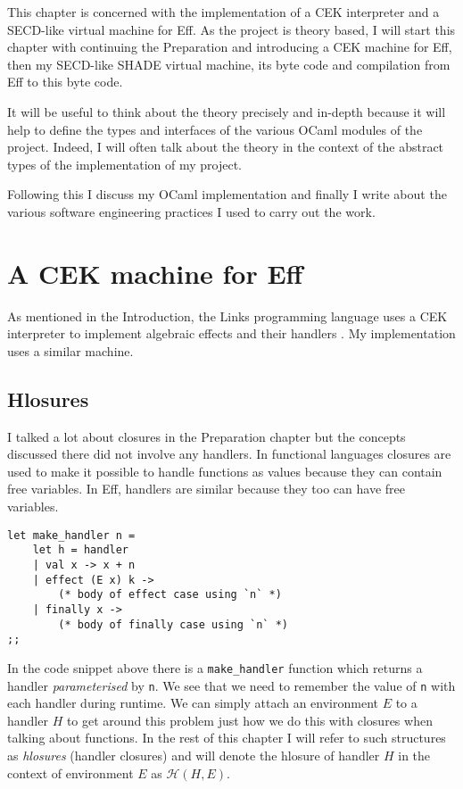 \documentclass[class=article, crop=false]{standalone}
\begin{document}
This chapter is concerned with the implementation of a CEK interpreter and
a SECD-like virtual machine for Eff. As the project is theory based, I will start this chapter
with continuing the Preparation and introducing a CEK machine for Eff, then my SECD-like
SHADE virtual machine, its byte code and compilation from Eff to this byte code.

It will be useful to think about the theory precisely and in-depth because it will
help to define the types and interfaces of the various OCaml modules of the project.
Indeed, I will often talk about the theory in the context of the abstract types
of the implementation of my project.

Following this I discuss my OCaml implementation and finally I write about the various 
software engineering practices I used to carry out the work.

\section{A CEK machine for Eff}

As mentioned in the Introduction, the Links programming language uses a CEK interpreter
to implement algebraic effects and their handlers \cite{hillerstrom2016compilation}.
My implementation uses a similar machine.

\subsection{Hlosures}

I talked a lot about closures in the Preparation chapter but the concepts discussed there
did not involve any handlers. In functional languages closures are used to make it possible
to handle functions as values because they can contain free variables. In Eff, handlers are
similar because they too can have free variables.

\begin{lstlisting}[language=efflang]
let make_handler n =
    let h = handler
    | val x -> x + n
    | effect (E x) k ->
        (* body of effect case using `n` *)
    | finally x ->
        (* body of finally case using `n` *)
;;
\end{lstlisting}

In the code snippet above there is a \verb|make_handler| function which returns a handler
\emph{parameterised} by \verb|n|. We see that we need to remember the value of \verb|n|
with each handler during runtime. We can simply attach an environment $E$ to a handler $H$ to
get around this problem just how we do this with closures when talking about functions.
In the rest of this chapter I will refer to such structures as \emph{hlosures} (handler closures)
and will denote the hlosure of handler $H$ in the context of environment $E$ as $\mathcal{H}(H, E)$.
\end{document}
